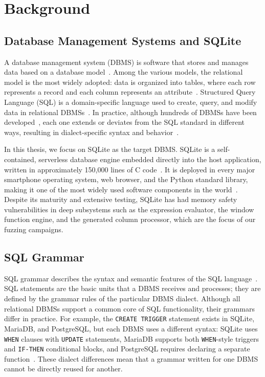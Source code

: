 \chapter{Background}
\label{chap:background}

\section{Database Management Systems and SQLite}
\label{sec:bg-dbms}

A database management system (DBMS) is software that stores and manages data based on a database model~\citep{dbms-wiki}. Among the various models, the relational model is the most widely adopted: data is organized into tables, where each row represents a record and each column represents an attribute~\citep{dbms-wiki}. Structured Query Language (SQL) is a domain-specific language used to create, query, and modify data in relational DBMSs~\citep{sql-standard}. In practice, although hundreds of DBMSs have been developed~\citep{dbengines}, each one extends or deviates from the SQL standard in different ways, resulting in dialect-specific syntax and behavior~\citep{griffin}.

In this thesis, we focus on SQLite as the target DBMS. SQLite is a self-contained, serverless database engine embedded directly into the host application, written in approximately 150{,}000 lines of C code~\citep{sqlite}. It is deployed in every major smartphone operating system, web browser, and the Python standard library, making it one of the most widely used software components in the world~\citep{sqlite}. Despite its maturity and extensive testing, SQLite has had memory safety vulnerabilities in deep subsystems such as the expression evaluator, the window function engine, and the generated column processor, which are the focus of our fuzzing campaigns.


\section{SQL Grammar}
\label{sec:bg-sql-grammar}

SQL grammar describes the syntax and semantic features of the SQL language~\citep{griffin}. SQL statements are the basic units that a DBMS receives and processes; they are defined by the grammar rules of the particular DBMS dialect. Although all relational DBMSs support a common core of SQL functionality, their grammars differ in practice. For example, the \texttt{CREATE TRIGGER} statement exists in SQLite, MariaDB, and PostgreSQL, but each DBMS uses a different syntax: SQLite uses \texttt{WHEN} clauses with \texttt{UPDATE} statements, MariaDB supports both \texttt{WHEN}-style triggers and \texttt{IF-THEN} conditional blocks, and PostgreSQL requires declaring a separate function~\citep{griffin}. These dialect differences mean that a grammar written for one DBMS cannot be directly reused for another.

